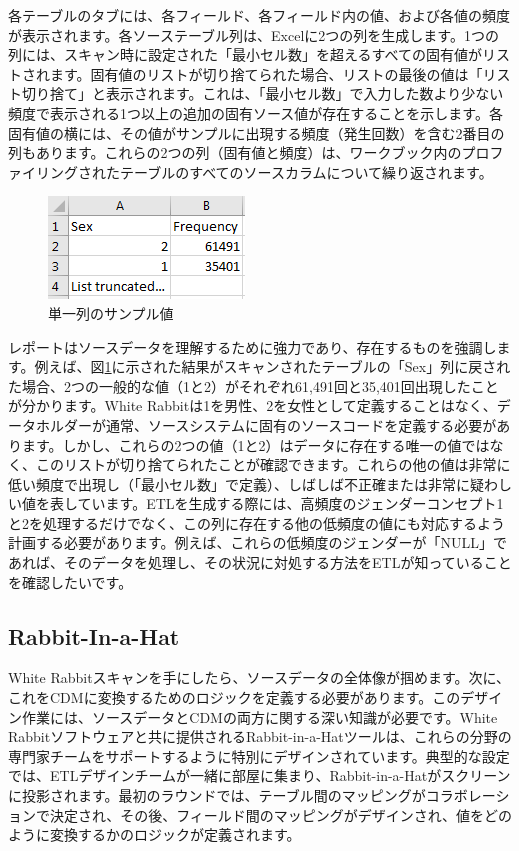 \documentclass[
  11pt]{book}
\theoremstyle{definition}
\theoremstyle{definition}
\theoremstyle{definition}
\theoremstyle{definition}
\theoremstyle{remark}
\begin{document}
各テーブルのタブには、各フィールド、各フィールド内の値、および各値の頻度が表示されます。各ソーステーブル列は、Excelに2つの列を生成します。1つの列には、スキャン時に設定された「最小セル数」を超えるすべての固有値がリストされます。固有値のリストが切り捨てられた場合、リストの最後の値は「リスト切り捨て」と表示されます。これは、「最小セル数」で入力した数より少ない頻度で表示される1つ以上の追加の固有ソース値が存在することを示します。各固有値の横には、その値がサンプルに出現する頻度（発生回数）を含む2番目の列もあります。これらの2つの列（固有値と頻度）は、ワークブック内のプロファイリングされたテーブルのすべてのソースカラムについて繰り返されます。

\begin{figure}

{\centering \includegraphics[width=0.3\linewidth]{images/ExtractTransformLoad/ScanSex} 

}

\caption{単一列のサンプル値}\label{fig:scanSex}
\end{figure}

レポートはソースデータを理解するために強力であり、存在するものを強調します。例えば、図\ref{fig:scanSex}に示された結果がスキャンされたテーブルの「Sex」列に戻された場合、2つの一般的な値（1と2）がそれぞれ61,491回と35,401回出現したことが分かります。White Rabbitは1を男性、2を女性として定義することはなく、データホルダーが通常、ソースシステムに固有のソースコードを定義する必要があります。しかし、これらの2つの値（1と2）はデータに存在する唯一の値ではなく、このリストが切り捨てられたことが確認できます。これらの他の値は非常に低い頻度で出現し（「最小セル数」で定義）、しばしば不正確または非常に疑わしい値を表しています。ETLを生成する際には、高頻度のジェンダーコンセプト1と2を処理するだけでなく、この列に存在する他の低頻度の値にも対応するよう計画する必要があります。例えば、これらの低頻度のジェンダーが「NULL」であれば、そのデータを処理し、その状況に対処する方法をETLが知っていることを確認したいです。

\subsection{Rabbit-In-a-Hat}\label{rabbit-in-a-hat}

White Rabbitスキャンを手にしたら、ソースデータの全体像が掴めます。次に、これをCDMに変換するためのロジックを定義する必要があります。このデザイン作業には、ソースデータとCDMの両方に関する深い知識が必要です。White Rabbitソフトウェアと共に提供されるRabbit-in-a-Hatツールは、これらの分野の専門家チームをサポートするように特別にデザインされています。典型的な設定では、ETLデザインチームが一緒に部屋に集まり、Rabbit-in-a-Hatがスクリーンに投影されます。最初のラウンドでは、テーブル間のマッピングがコラボレーションで決定され、その後、フィールド間のマッピングがデザインされ、値をどのように変換するかのロジックが定義されます。 
\end{document}
